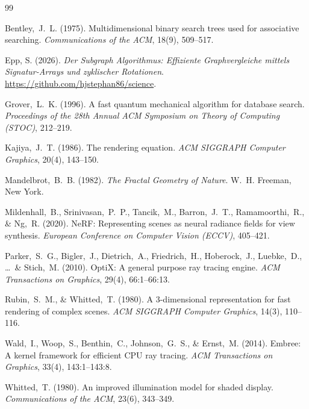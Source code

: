 ﻿\documentclass[a4paper,12pt]{article}
\theoremstyle{definition}
\begin{document}
\begin{thebibliography}{99}

Bentley,~J.~L. (1975).
Multidimensional binary search trees used for associative searching.
\emph{Communications of the ACM}, 18(9), 509--517.

Epp, S. (2026).
\emph{Der Subgraph Algorithmus: Effiziente Graphvergleiche mittels
Signatur-Arrays und zyklischer Rotationen}.
\url{https://github.com/hjstephan86/science}.

Grover,~L.~K. (1996).
A fast quantum mechanical algorithm for database search.
\emph{Proceedings of the 28th Annual ACM Symposium on Theory of
Computing (STOC)}, 212--219.

Kajiya,~J.~T. (1986).
The rendering equation.
\emph{ACM SIGGRAPH Computer Graphics}, 20(4), 143--150.

Mandelbrot,~B.~B. (1982).
\emph{The Fractal Geometry of Nature}.
W.~H. Freeman, New York.

Mildenhall,~B., Srinivasan,~P.~P., Tancik,~M., Barron,~J.~T.,
Ramamoorthi,~R., \& Ng,~R. (2020).
NeRF: Representing scenes as neural radiance fields for view synthesis.
\emph{European Conference on Computer Vision (ECCV)}, 405--421.

Parker,~S.~G., Bigler,~J., Dietrich,~A., Friedrich,~H., Hoberock,~J.,
Luebke,~D., \ldots\  \& Stich,~M. (2010).
OptiX: A general purpose ray tracing engine.
\emph{ACM Transactions on Graphics}, 29(4), 66:1--66:13.

Rubin,~S.~M., \& Whitted,~T. (1980).
A 3-dimensional representation for fast rendering of complex scenes.
\emph{ACM SIGGRAPH Computer Graphics}, 14(3), 110--116.

Wald,~I., Woop,~S., Benthin,~C., Johnson,~G.~S., \& Ernst,~M. (2014).
Embree: A kernel framework for efficient CPU ray tracing.
\emph{ACM Transactions on Graphics}, 33(4), 143:1--143:8.

Whitted,~T. (1980).
An improved illumination model for shaded display.
\emph{Communications of the ACM}, 23(6), 343--349.

\end{thebibliography}
\end{document}
